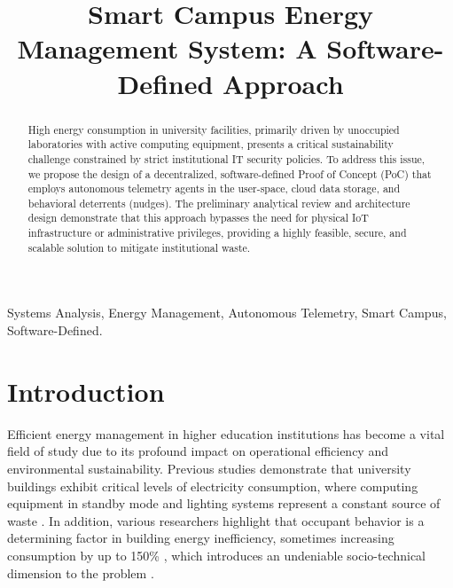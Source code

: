 \documentclass[conference]{IEEEtran}
\begin{document}
\title{Smart Campus Energy Management System: A Software-Defined Approach}

\author{
}

\maketitle

\begin{abstract}
High energy consumption in university facilities, primarily driven by unoccupied laboratories with active computing equipment, presents a critical sustainability challenge constrained by strict institutional IT security policies. To address this issue, we propose the design of a decentralized, software-defined Proof of Concept (PoC) that employs autonomous telemetry agents in the user-space, cloud data storage, and behavioral deterrents (nudges). The preliminary analytical review and architecture design demonstrate that this approach bypasses the need for physical IoT infrastructure or administrative privileges, providing a highly feasible, secure, and scalable solution to mitigate institutional waste.
\end{abstract}

\begin{IEEEkeywords}
Systems Analysis, Energy Management, Autonomous Telemetry, Smart Campus, Software-Defined.
\end{IEEEkeywords}

\section{Introduction}
Efficient energy management in higher education institutions has become a vital field of study due to its profound impact on operational efficiency and environmental sustainability. Previous studies demonstrate that university buildings exhibit critical levels of electricity consumption, where computing equipment in standby mode and lighting systems represent a constant source of waste \cite{b1, b4}. In addition, various researchers highlight that occupant behavior is a determining factor in building energy inefficiency, sometimes increasing consumption by up to 150\% \cite{b2}, which introduces an undeniable socio-technical dimension to the problem \cite{b3}.
\end{document}
